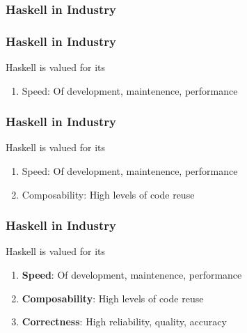 \begin{frame}
\frametitle{Haskell in Industry}
\end{frame}


\begin{frame}
\frametitle{Haskell in Industry}

Haskell is valued for its

\begin{enumerate}

    \item Speed: Of development, maintenence, performance

\end{enumerate}

\end{frame}


\begin{frame}
\frametitle{Haskell in Industry}

Haskell is valued for its

\begin{enumerate}

    \item Speed: Of development, maintenence, performance
    \item Composability: High levels of code reuse

\end{enumerate}

\end{frame}


\begin{frame}
\frametitle{Haskell in Industry}

Haskell is valued for its

\begin{enumerate}

    \item {\bf Speed}: Of development, maintenence, performance
    \item {\bf Composability}: High levels of code reuse
    \item {\bf Correctness}: High reliability, quality, accuracy

\end{enumerate}

\end{frame}

